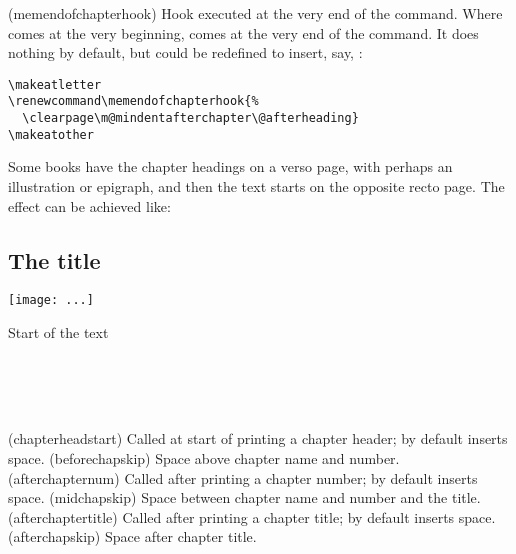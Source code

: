 \begin{syntax}
\cmd{\memendofchapterhook} 
\end{syntax}
\glossary(memendofchapterhook)%
  {}%
  {Hook executed at the very end of the  command.}
Where \cmd{\clearforchapter} comes at the very beginning,
\cmd{\memendofchapterhook} comes at the very end of the \cmd{\chapter}
command. It does nothing by default, but could be redefined to insert,
say, \cmd{\clearpage}:
\begin{verbatim}
\makeatletter
\renewcommand\memendofchapterhook{%
  \clearpage\m@mindentafterchapter\@afterheading}
\makeatother
\end{verbatim}


    Some books have the chapter headings on a verso page, with perhaps
an illustration or epigraph, and 
then the text starts on the opposite
recto page. The effect can be achieved like:
\begin{lcode}
\openleft                %
\chapter{The title}      %
\begin{centering}        %
\texttt{[image: ...]}
\end{centering}
\clearpage               %
Start of the text        %
\end{lcode}


\begin{syntax}
\cmd{\chapterheadstart} \lnc{\beforechapskip} \\ 
\cmd{\afterchapternum} \lnc{\midchapskip} \\
\cmd{\afterchaptertitle} \lnc{\afterchapskip} \\
\end{syntax}
\glossary(chapterheadstart)%
  {}%
  {Called at start of printing a chapter header; by default inserts  space.}
\glossary(beforechapskip)%
  {}%
  {Space above chapter name and number.}
\glossary(afterchapternum)%
  {}%
  {Called after printing a chapter number; by default inserts  space.}
\glossary(midchapskip)%
  {}%
  {Space between chapter name and number and the title.}
\glossary(afterchaptertitle)%
  {}%
  {Called after printing a chapter title; by default inserts  space.}
\glossary(afterchapskip)%
  {}%
  {Space after chapter title.}

